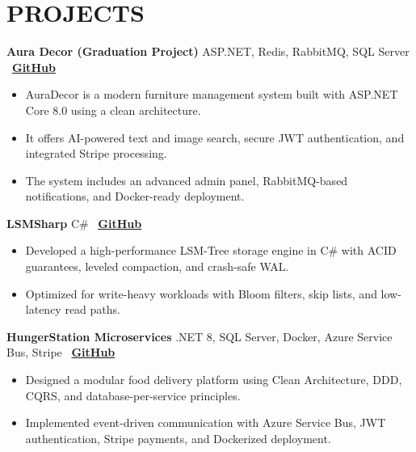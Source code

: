 \documentclass[letterpaper, 11pt]{article}
\begin{document}
\section{PROJECTS}
\vspace{0.5em}

\textbf{Aura Decor (Graduation Project) \textbar{}} ASP.NET, Redis, RabbitMQ, SQL Server
\hfill \faGithub~\textbf{\href{https://github.com/Mo7ammedd/Aura-Decor}{GitHub}} \\
\vspace{-0.6em}
\begin{itemize}[leftmargin=1.5em, nosep, itemsep=0.15em]
    \item AuraDecor is a modern furniture management system built with ASP.NET Core 8.0 using a clean architecture.
    \item It offers AI-powered text and image search, secure JWT authentication, and integrated Stripe processing.
    \item The system includes an advanced admin panel, RabbitMQ-based notifications, and Docker-ready deployment.
\end{itemize}

\vspace{0.6em}
\textbf{LSMSharp \textbar{}} C\#
\hfill \faGithub~\textbf{\href{https://github.com/Mo7ammedd/LSMSharp}{GitHub}} \\
\vspace{-0.6em}
\begin{itemize}[leftmargin=1.5em, nosep, itemsep=0.15em]
    \item Developed a high-performance LSM-Tree storage engine in C\# with ACID guarantees, leveled compaction, and crash-safe WAL.
    \item Optimized for write-heavy workloads with Bloom filters, skip lists, and low-latency read paths.
\end{itemize}

\vspace{0.6em}
\textbf{HungerStation Microservices \textbar{}} .NET 8, SQL Server, Docker, Azure Service Bus, Stripe
\hfill \faGithub~\textbf{\href{https://github.com/Mo7ammedd/HungerStation_Microservices}{GitHub}} \\
\vspace{-0.6em}
\begin{itemize}[leftmargin=1.5em, nosep, itemsep=0.15em]
    \item Designed a modular food delivery platform using Clean Architecture, DDD, CQRS, and database-per-service principles.
    \item Implemented event-driven communication with Azure Service Bus, JWT authentication, Stripe payments, and Dockerized deployment.
\end{itemize}
\end{document}
